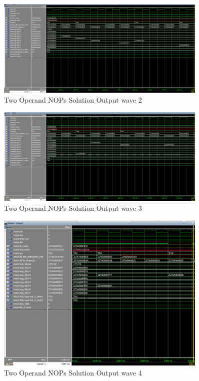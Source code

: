 \begin{figure}[H]
    \centering
    \includegraphics[width=0.9\textwidth]{images/test_cases/two_operand/TwoOperand_NOP_2.PNG}
    \caption{Two Operand NOPs Solution Output wave 2}
    \label{fig:2op_nop_2}
\end{figure}

\begin{figure}[H]
    \centering
    \includegraphics[width=0.9\textwidth]{images/test_cases/two_operand/TwoOperand_NOP_3.PNG}
    \caption{Two Operand NOPs Solution Output wave 3}
    \label{fig:2op_nop_3}
\end{figure}

\begin{figure}[H]
    \centering
    \includegraphics[width=0.9\textwidth]{images/test_cases/two_operand/TwoOperand_NOP_4.PNG}
    \caption{Two Operand NOPs Solution Output wave 4}
    \label{fig:2op_nop_4}
\end{figure}

